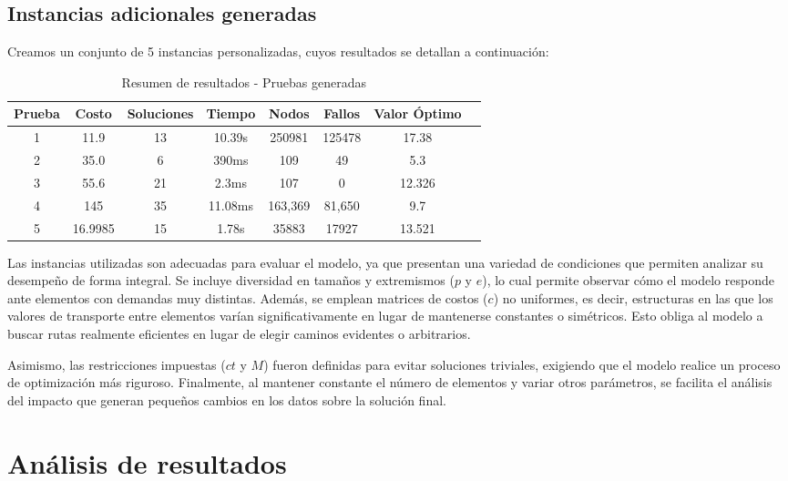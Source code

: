 \subsection{Instancias adicionales generadas}

Creamos un conjunto de 5 instancias personalizadas, cuyos resultados se detallan a continuación:

\begin{table}[H]
	\centering
	\caption{Resumen de resultados - Pruebas generadas}
	\begin{tabular}{|c|c|c|c|c|c|c|c|}
		\hline
		\rowcolor{gray!30}
		\textbf{Prueba} & \textbf{Costo} & \textbf{Soluciones} & \textbf{Tiempo} & \textbf{Nodos} & \textbf{Fallos} & \textbf{Valor Óptimo} \\
		\hline
		1   &  11.9 & 13   & 10.39s  & 250981   & 125478   & 17.38 \\
		2     & 35.0  &  6 & 390ms  &  109 & 49  & 5.3 \\
		3   &  55.6 &  21  & 2.3ms &  107  & 0 & 12.326 \\
		4   & 145 & 35  & 11.08ms  & 163,369 & 81,650  & 9.7 \\
		5  & 16.9985 & 15 & 1.78s  & 35883 &  17927  & 13.521 \\
		\hline
	\end{tabular}
\end{table}

Las instancias utilizadas son adecuadas para evaluar el modelo, ya que presentan una variedad de condiciones que permiten analizar su desempeño de forma integral. Se incluye diversidad en tamaños y extremismos ($p$ y $e$), lo cual permite observar cómo el modelo responde ante elementos con demandas muy distintas. Además, se emplean matrices de costos ($c$) no uniformes, es decir, estructuras en las que los valores de transporte entre elementos varían significativamente en lugar de mantenerse constantes o simétricos. Esto obliga al modelo a buscar rutas realmente eficientes en lugar de elegir caminos evidentes o arbitrarios.

Asimismo, las restricciones impuestas ($ct$ y $M$) fueron definidas para evitar soluciones triviales, exigiendo que el modelo realice un proceso de optimización más riguroso. Finalmente, al mantener constante el número de elementos y variar otros parámetros, se facilita el análisis del impacto que generan pequeños cambios en los datos sobre la solución final.

\section{Análisis de resultados}

